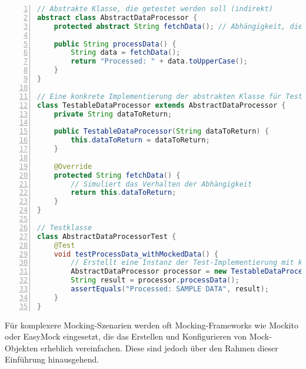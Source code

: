 \begin{lstlisting}[language=Java, caption={Konzept einer Mock-Klasse (vereinfacht)}, label=lst:junit_mock_concept, basicstyle=\ttfamily\footnotesize, breaklines=true, frame=tb, numbers=left]
// Abstrakte Klasse, die getestet werden soll (indirekt)
abstract class AbstractDataProcessor {
    protected abstract String fetchData(); // Abhängigkeit, die gemockt werden könnte

    public String processData() {
        String data = fetchData();
        return "Processed: " + data.toUpperCase();
    }
}

// Eine konkrete Implementierung der abstrakten Klasse für Testzwecke (eine Art Mock)
class TestableDataProcessor extends AbstractDataProcessor {
    private String dataToReturn;

    public TestableDataProcessor(String dataToReturn) {
        this.dataToReturn = dataToReturn;
    }

    @Override
    protected String fetchData() {
        // Simuliert das Verhalten der Abhängigkeit
        return this.dataToReturn;
    }
}

// Testklasse
class AbstractDataProcessorTest {
    @Test
    void testProcessData_withMockedData() {
        // Erstellt eine Instanz der Test-Implementierung mit kontrollierten Daten
        AbstractDataProcessor processor = new TestableDataProcessor("sample data");
        String result = processor.processData();
        assertEquals("Processed: SAMPLE DATA", result);
    }
}
\end{lstlisting}
Für komplexere Mocking-Szenarien werden oft Mocking-Frameworks wie Mockito oder EasyMock eingesetzt, die das Erstellen und Konfigurieren von Mock-Objekten erheblich vereinfachen. Diese sind jedoch über den Rahmen dieser Einführung hinausgehend.

